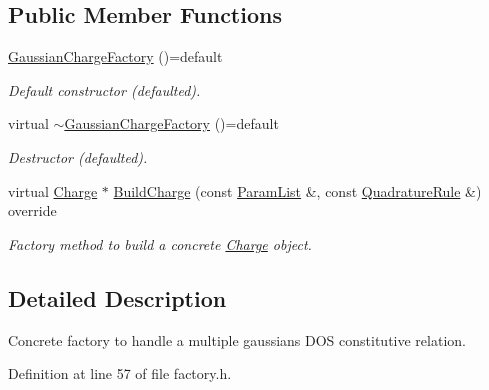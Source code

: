 \subsection*{Public Member Functions}
\begin{DoxyCompactItemize}
\item 
\hypertarget{classGaussianChargeFactory_aedb4a8bbdd1d9723ea5e732053fa8ffe}{\hyperlink{classGaussianChargeFactory_aedb4a8bbdd1d9723ea5e732053fa8ffe}{Gaussian\-Charge\-Factory} ()=default}\label{classGaussianChargeFactory_aedb4a8bbdd1d9723ea5e732053fa8ffe}

\begin{DoxyCompactList}\small\item\em Default constructor (defaulted). \end{DoxyCompactList}\item 
\hypertarget{classGaussianChargeFactory_a13ba2c7152c6f6c358afd62071c6e08b}{virtual \hyperlink{classGaussianChargeFactory_a13ba2c7152c6f6c358afd62071c6e08b}{$\sim$\-Gaussian\-Charge\-Factory} ()=default}\label{classGaussianChargeFactory_a13ba2c7152c6f6c358afd62071c6e08b}

\begin{DoxyCompactList}\small\item\em Destructor (defaulted). \end{DoxyCompactList}\item 
virtual \hyperlink{classCharge}{Charge} $\ast$ \hyperlink{classGaussianChargeFactory_a1e1718ca16c1624e98865bc6359c2136}{Build\-Charge} (const \hyperlink{classParamList}{Param\-List} \&, const \hyperlink{classQuadratureRule}{Quadrature\-Rule} \&) override
\begin{DoxyCompactList}\small\item\em Factory method to build a concrete \hyperlink{classCharge}{Charge} object. \end{DoxyCompactList}\end{DoxyCompactItemize}


\subsection{Detailed Description}
Concrete factory to handle a multiple gaussians D\-O\-S constitutive relation. 

Definition at line 57 of file factory.\-h.



